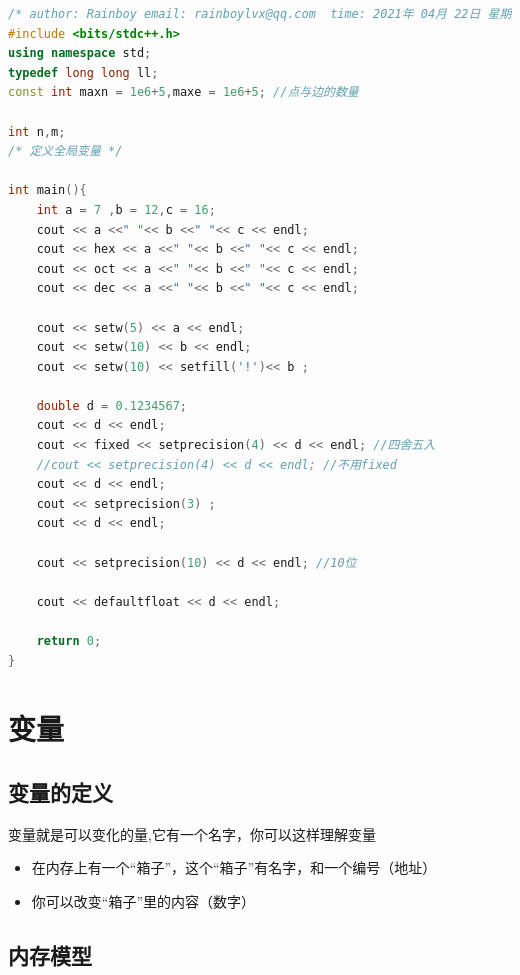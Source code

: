 \documentclass[
  paper=a4,
  ,captions=tableheading
]{scrbook}
\providecommand{\tightlist}{%
  \setlength{\itemsep}{0pt}\setlength{\parskip}{0pt}}
\begin{document}
\begin{lstlisting}[language={C++}]
/* author: Rainboy email: rainboylvx@qq.com  time: 2021年 04月 22日 星期四 20:52:19 CST */
#include <bits/stdc++.h>
using namespace std;
typedef long long ll;
const int maxn = 1e6+5,maxe = 1e6+5; //点与边的数量

int n,m;
/* 定义全局变量 */

int main(){
    int a = 7 ,b = 12,c = 16;
    cout << a <<" "<< b <<" "<< c << endl;
    cout << hex << a <<" "<< b <<" "<< c << endl;
    cout << oct << a <<" "<< b <<" "<< c << endl;
    cout << dec << a <<" "<< b <<" "<< c << endl;

    cout << setw(5) << a << endl;
    cout << setw(10) << b << endl;
    cout << setw(10) << setfill('!')<< b ;

    double d = 0.1234567;
    cout << d << endl;
    cout << fixed << setprecision(4) << d << endl; //四舍五入
    //cout << setprecision(4) << d << endl; //不用fixed
    cout << d << endl;
    cout << setprecision(3) ;
    cout << d << endl;

    cout << setprecision(10) << d << endl; //10位

    cout << defaultfloat << d << endl;

    return 0;
}
\end{lstlisting}

\hypertarget{ux53d8ux91cf}{%
\section{变量}\label{ux53d8ux91cf}}

\hypertarget{ux53d8ux91cfux7684ux5b9aux4e49}{%
\subsection{变量的定义}\label{ux53d8ux91cfux7684ux5b9aux4e49}}

变量就是可以变化的量,它有一个名字，你可以这样理解变量

\begin{itemize}
\tightlist
\item
  在内存上有一个``箱子''，这个``箱子''有名字，和一个编号（地址）
\item
  你可以改变``箱子''里的内容（数字）
\end{itemize}

\hypertarget{ux5185ux5b58ux6a21ux578b}{%
\subsection{内存模型}\label{ux5185ux5b58ux6a21ux578b}}
\end{document}
